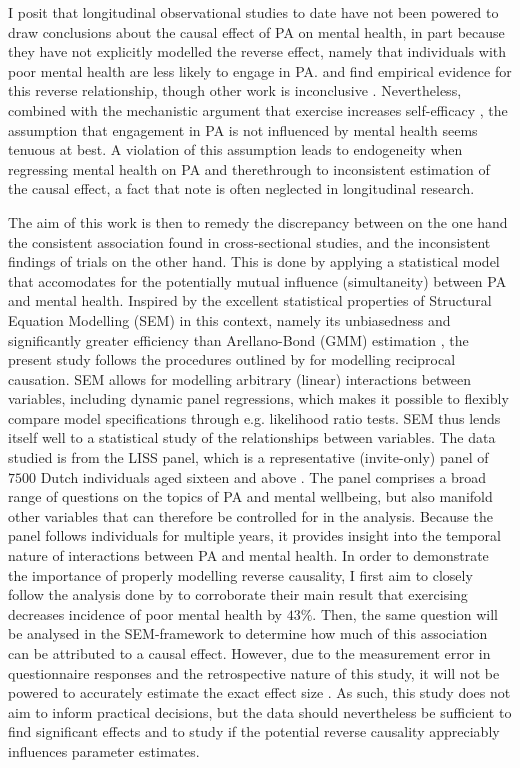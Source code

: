 \documentclass[a4paper,11pt]{report}
\begin{document}
I posit that longitudinal observational studies to date have not been powered to draw conclusions about the causal effect
of PA on mental health, in part because they have not explicitly modelled the reverse effect, namely that individuals with poor
mental health are less likely to engage in PA.
 and  find empirical evidence for this reverse relationship,
though other work is inconclusive \cite{birkeland2009longitudinal, ku2012physical}. Nevertheless, combined with the
mechanistic argument that exercise increases self-efficacy \cite{smith2021role}, the assumption that engagement in PA is
not influenced by mental health seems tenuous at best.
A violation of this assumption leads to endogeneity when regressing mental health on PA and therethrough to
inconsistent estimation of the causal effect, a fact that  note is often neglected in
longitudinal research.

The aim of this work is then to remedy the discrepancy between on the one hand the consistent association found in
cross-sectional studies, and the inconsistent findings of trials on the other hand.
This is done by applying a statistical model that accomodates for the potentially mutual influence (simultaneity)
between PA and mental health. Inspired by the excellent statistical properties of Structural Equation Modelling (SEM)
in this context, namely its unbiasedness and significantly greater efficiency than Arellano-Bond (GMM) estimation
\cite{leszczensky2022deal}, the present study follows the procedures outlined by 
for modelling reciprocal causation.
SEM allows for modelling arbitrary (linear) interactions between variables, including dynamic panel regressions,
which makes it possible to flexibly compare model specifications through e.g. likelihood ratio tests.
SEM thus lends itself well to a statistical study of the relationships between variables.
The data studied is from the LISS panel, which is a representative (invite-only) panel of $7500$ Dutch individuals aged
sixteen and above \cite{scherpenzeel2010liss}. The panel comprises a broad range of questions on the topics of PA and
mental wellbeing, but also manifold other variables that can therefore be controlled for in the analysis.
Because the panel follows individuals for multiple years, it provides insight into the temporal nature of interactions
between PA and mental health.
In order to demonstrate the importance of properly modelling reverse causality, I first aim to closely follow
the analysis done by  to corroborate their main result that exercising decreases incidence
of poor mental health by $43\%$.
Then, the same question will be analysed in the SEM-framework to determine how much of this association can be attributed
to a causal effect. However, due to the measurement error in questionnaire responses and the retrospective nature of this study,
it will not be powered to accurately estimate the exact effect size \cite{pereira2014depressive}.
As such, this study does not aim to inform practical decisions, but the data should nevertheless be sufficient to find
significant effects and to study if the potential reverse causality appreciably influences parameter estimates.
\end{document}
